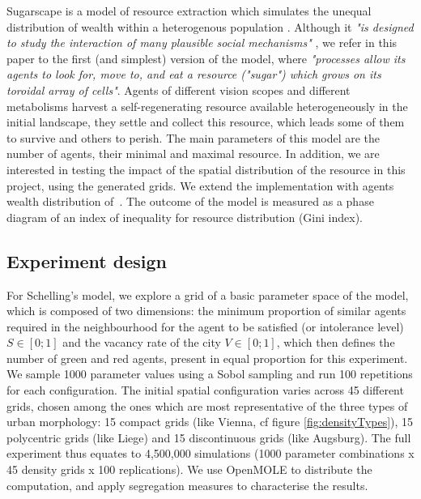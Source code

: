 \documentclass[Royal,sageh,times]{sagej}
\begin{document}
Sugarscape is a model of resource extraction which simulates the unequal distribution of wealth within a heterogenous population \citep{EpsteinAxtell1996}. Although it {\it "is designed to study the interaction of many plausible social mechanisms"} \citep[p.125]{Axtelletal1996}, we refer in this paper to the first (and simplest) version of the model, where {\it "processes allow its agents to look for, move to, and eat a resource ("sugar") which grows on its toroidal array of cells"}. Agents of different vision scopes and different metabolisms harvest a self-regenerating resource available heterogeneously in the initial landscape, they settle and collect this resource, which leads some of them to survive and others to perish. The main parameters of this model are the number of agents, their minimal and maximal resource. In addition, we are interested in testing the impact of the spatial distribution of the resource in this project, using the generated grids. We extend the implementation with agents wealth distribution of~\citet{li2009netlogo}. The outcome of the model is measured as a phase diagram of an index of inequality for resource distribution (Gini index). 


\subsection{Experiment design}
For Schelling's model, we explore a grid of a basic parameter space of the model, which is composed of two dimensions: the minimum proportion of similar agents required in the neighbourhood for the agent to be satisfied (or intolerance level) $S\in \left[0;1\right]$ and the vacancy rate of the city $V\in \left[0;1\right]$, which then defines the number of green and red agents, present in equal proportion for this experiment. We sample 1000 parameter values using a Sobol sampling and run 100 repetitions for each configuration. The initial spatial configuration varies across 45 different grids, chosen among the ones which are most representative of the three types of urban morphology: 15 compact grids (like Vienna, cf figure \ref{fig:densityTypes}), 15 polycentric grids (like Liege) and 15 discontinuous grids (like Augsburg). The full experiment thus equates to 4,500,000 simulations (1000 parameter combinations x 45 density grids x 100 replications). We use OpenMOLE to distribute the computation, and apply segregation measures to characterise the results.
\end{document}
